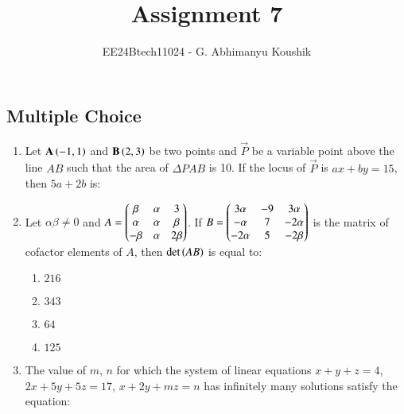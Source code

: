 \documentclass[journal,12pt,onecolumn]{IEEEtran}
\theoremstyle{remark}
\begin{document}
\title{Assignment 7}
\author{EE24Btech11024 - G. Abhimanyu Koushik}
\maketitle
\renewcommand{\thefigure}{\theenumi}
\renewcommand{\thetable}{\theenumi}
\subsection{Multiple Choice}
\begin{enumerate}

\item Let $\mathbf{A}\left(-1,1\right)$ and $\mathbf{B}\left(2,3\right)$ be two points and $\vec{P}$ be a variable point above the line $AB$ such that the area of $\Delta PAB$ is 10. If the locus of $\vec{P}$ is $ax+by=15$, then $5a+2b$ is:

\hfill{}
\begin{enumerate}
\end{enumerate}

\item Let $\alpha\beta\neq 0$ and $A=\begin{pmatrix}\beta & \alpha & 3\\\alpha & \alpha & \beta\\-\beta & \alpha & 2\beta\end{pmatrix}$. If $B=\begin{pmatrix}3\alpha & -9 & 3\alpha\\-\alpha & 7 & -2\alpha \\ -2\alpha & 5 & -2\beta\end{pmatrix}$ is the matrix of cofactor elements of $A$, then $\det\left(AB\right)$ is equal to:

\hfill{}
\begin{enumerate}
\item $216$
\item $343$
\item $64$
\item $125$
\end{enumerate}

\item The value of $m$, $n$ for which the system of linear equations \newline $x+y+z=4$, \newline $2x+5y+5z=17$, \newline $x+2y+mz=n$ \newline has infinitely many solutions satisfy the equation:


\end{enumerate}
\end{document}

